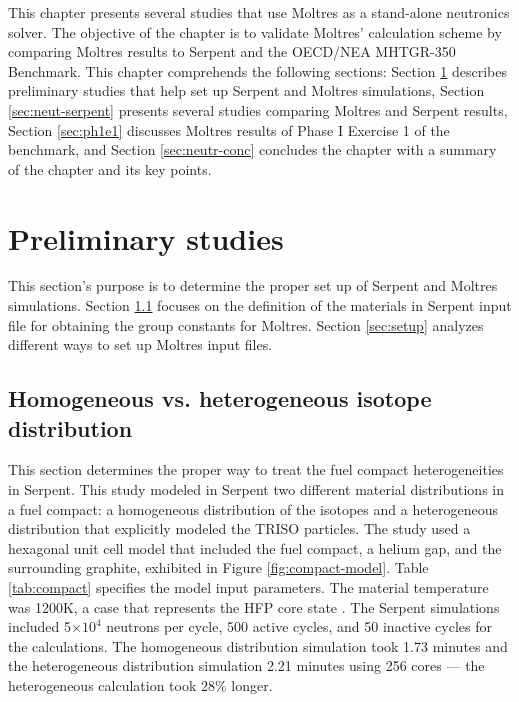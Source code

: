 \label{ch:neutronics}

This chapter presents several studies that use Moltres as a stand-alone neutronics solver.
The objective of the chapter is to validate Moltres' calculation scheme by comparing Moltres results to Serpent and the OECD/NEA MHTGR-350 Benchmark.
This chapter comprehends the following sections: Section \ref{sec:neut-prelim} describes preliminary studies that help set up Serpent and Moltres simulations, Section \ref{sec:neut-serpent} presents several studies comparing Moltres and Serpent results, Section \ref{sec:ph1e1} discusses Moltres results of Phase I Exercise 1 of the benchmark, and Section \ref{sec:neutr-conc} concludes the chapter with a summary of the chapter and its key points.

\section{Preliminary studies}
\label{sec:neut-prelim}

This section's purpose is to determine the proper set up of Serpent and Moltres simulations.
Section \ref{sec:homo-hetero} focuses on the definition of the materials in Serpent input file for obtaining the group constants for Moltres.
Section \ref{sec:setup} analyzes different ways to set up Moltres input files.

\subsection{Homogeneous vs. heterogeneous isotope distribution}
\label{sec:homo-hetero}

This section determines the proper way to treat the fuel compact heterogeneities in Serpent.
This study modeled in Serpent two different material distributions in a fuel compact: a homogeneous distribution of the isotopes and a heterogeneous distribution that explicitly modeled the TRISO particles.
The study used a hexagonal unit cell model that included the fuel compact, a helium gap, and the surrounding graphite, exhibited in Figure \ref{fig:compact-model}.
Table \ref{tab:compact} specifies the model input parameters.
The material temperature was 1200K, a case that represents the \gls{HFP} core state \cite{strydom_results_2015}.
The Serpent simulations included 5$\times 10^4$ neutrons per cycle, 500 active cycles, and 50 inactive cycles for the calculations.
The homogeneous distribution simulation took 1.73 minutes and the heterogeneous distribution simulation 2.21 minutes using 256 cores --- the heterogeneous calculation took 28$\%$ longer.

